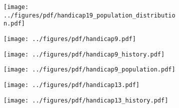 \documentclass[shownotes]{beamer}
\begin{document}
\begin{frame}
  \begin{figure}[H]     
     \centering \normalsize
     \begin{subfigure}[b]{0.8\textwidth}
     \texttt{[image: ../figures/pdf/handicap19\_population\_distribution.pdf]} 
     \end{subfigure}
  \end{figure}
\end{frame}

\begin{frame}
  \begin{figure}[H]     
     \centering \normalsize
     \begin{subfigure}[b]{0.8\textwidth}
     \texttt{[image: ../figures/pdf/handicap9.pdf]} 
     \end{subfigure}
  \end{figure}
\end{frame}

\begin{frame}
  \begin{figure}[H]     
     \centering \normalsize
     \begin{subfigure}[b]{0.8\textwidth}
     \texttt{[image: ../figures/pdf/handicap9\_history.pdf]} 
     \end{subfigure}
  \end{figure}
\end{frame}

\begin{frame}
  \begin{figure}[H]     
     \centering \normalsize
     \begin{subfigure}[b]{0.8\textwidth}
     \texttt{[image: ../figures/pdf/handicap9\_population.pdf]} 
     \end{subfigure}
  \end{figure}
\end{frame}


\begin{frame}
  \begin{figure}[H]     
     \centering \normalsize
     \begin{subfigure}[b]{0.8\textwidth}
     \texttt{[image: ../figures/pdf/handicap13.pdf]} 
     \end{subfigure}
  \end{figure}
\end{frame}

\begin{frame}
  \begin{figure}[H]     
     \centering \normalsize
     \begin{subfigure}[b]{0.8\textwidth}
     \texttt{[image: ../figures/pdf/handicap13\_history.pdf]} 
     \end{subfigure}
  \end{figure}
\end{frame}
\end{document}
